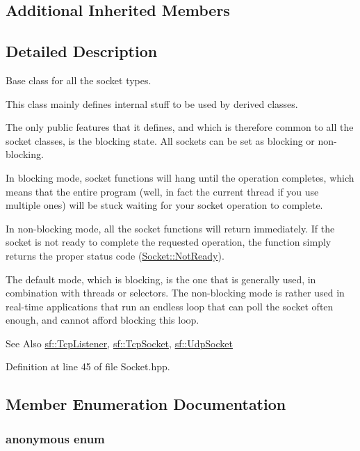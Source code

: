 \subsection*{Additional Inherited Members}


\subsection{Detailed Description}
Base class for all the socket types. 

This class mainly defines internal stuff to be used by derived classes.

The only public features that it defines, and which is therefore common to all the socket classes, is the blocking state. All sockets can be set as blocking or non-\/blocking.

In blocking mode, socket functions will hang until the operation completes, which means that the entire program (well, in fact the current thread if you use multiple ones) will be stuck waiting for your socket operation to complete.

In non-\/blocking mode, all the socket functions will return immediately. If the socket is not ready to complete the requested operation, the function simply returns the proper status code (\hyperlink{classsf_1_1_socket_a51bf0fd51057b98a10fbb866246176dca8554848daae98f996e131bdeed076c09}{Socket\-::\-Not\-Ready}).

The default mode, which is blocking, is the one that is generally used, in combination with threads or selectors. The non-\/blocking mode is rather used in real-\/time applications that run an endless loop that can poll the socket often enough, and cannot afford blocking this loop.

\begin{DoxySeeAlso}{See Also}
\hyperlink{classsf_1_1_tcp_listener}{sf\-::\-Tcp\-Listener}, \hyperlink{classsf_1_1_tcp_socket}{sf\-::\-Tcp\-Socket}, \hyperlink{classsf_1_1_udp_socket}{sf\-::\-Udp\-Socket} 
\end{DoxySeeAlso}


Definition at line 45 of file Socket.\-hpp.



\subsection{Member Enumeration Documentation}
\hypertarget{classsf_1_1_socket_a1b900779ad24d3604a4a000e2e38f372}{\subsubsection[{anonymous enum}]{\setlength{\rightskip}{0pt plus 5cm}anonymous enum}}\label{classsf_1_1_socket_a1b900779ad24d3604a4a000e2e38f372}


